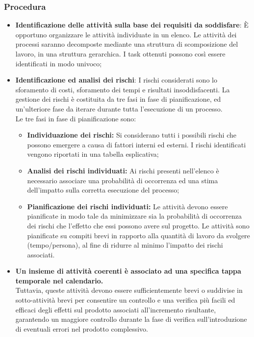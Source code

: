 \subsubsection{Procedura}
\begin{itemize}
    \item \textbf{Identificazione delle attività sulla base dei requisiti da soddisfare}: È opportuno organizzare le attività individuate in un elenco. Le attività dei processi saranno decomposte mediante una struttura di scomposizione del lavoro, in una struttura gerarchica. I task ottenuti possono così essere identificati in modo univoco;
    \item \textbf{Identificazione ed analisi dei rischi}: I rischi considerati sono lo sforamento di costi, sforamento dei tempi e risultati insoddisfacenti. La gestione dei rischi è costituita da tre fasi in fase di pianificazione, ed un'ulteriore fase da iterare durante tutta l'esecuzione di un processo. \\
    Le tre fasi in fase di pianificazione sono: 
    \begin{itemize}
     \item \textbf{Individuazione dei rischi:} Si considerano tutti i possibili rischi che possono emergere a causa di fattori interni ed esterni. I rischi identificati vengono riportati in una tabella esplicativa;
     \item \textbf{Analisi dei rischi individuati:} Ai rischi presenti nell'elenco è necessario associare una probabilità di occorrenza ed una stima dell'impatto sulla corretta esecuzione del processo;
     \item \textbf{Pianificazione dei rischi individuati:} Le attività devono essere pianificate in modo tale da minimizzare sia la probabilità di occorrenza dei rischi che l'effetto che essi possono avere sul progetto. Le attività sono pianificate su compiti brevi in rapporto alla quantità di lavoro da svolgere (tempo/persona), al fine di ridurre al minimo l'impatto dei rischi associati.
    \end{itemize}
     \item \textbf{Un insieme di attività coerenti è associato ad una specifica tappa temporale nel calendario.}\\ Tuttavia, queste attività devono essere sufficientemente brevi o suddivise in sotto-attività brevi per consentire un controllo e una verifica più facili ed efficaci degli effetti sul prodotto associati all'incremento risultante, garantendo un maggiore controllo durante la fase di verifica sull'introduzione di eventuali errori nel prodotto complessivo. \\ 

\end{itemize}

